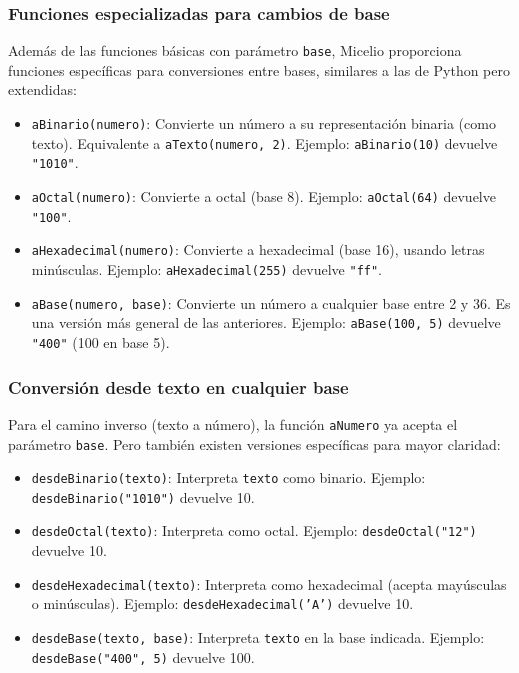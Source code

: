 \documentclass[12pt]{article}
\begin{document}
\subsubsection{Funciones especializadas para cambios de base}

Además de las funciones básicas con parámetro \texttt{base}, Micelio proporciona funciones específicas para conversiones entre bases, similares a las de Python pero extendidas:

\begin{itemize}
    \item \texttt{aBinario(numero)}: Convierte un número a su representación binaria (como texto). Equivalente a \texttt{aTexto(numero, 2)}. Ejemplo: \texttt{aBinario(10)} devuelve \texttt{"1010"}.
    
    \item \texttt{aOctal(numero)}: Convierte a octal (base 8). Ejemplo: \texttt{aOctal(64)} devuelve \texttt{"100"}.
    
    \item \texttt{aHexadecimal(numero)}: Convierte a hexadecimal (base 16), usando letras minúsculas. Ejemplo: \texttt{aHexadecimal(255)} devuelve \texttt{"ff"}.
    
    \item \texttt{aBase(numero, base)}: Convierte un número a cualquier base entre 2 y 36. Es una versión más general de las anteriores. Ejemplo: \texttt{aBase(100, 5)} devuelve \texttt{"400"} (100 en base 5).
\end{itemize}

\subsubsection{Conversión desde texto en cualquier base}

Para el camino inverso (texto a número), la función \texttt{aNumero} ya acepta el parámetro \texttt{base}. Pero también existen versiones específicas para mayor claridad:

\begin{itemize}
    \item \texttt{desdeBinario(texto)}: Interpreta \texttt{texto} como binario. Ejemplo: \texttt{desdeBinario("1010")} devuelve 10.
    \item \texttt{desdeOctal(texto)}: Interpreta como octal. Ejemplo: \texttt{desdeOctal("12")} devuelve 10.
    \item \texttt{desdeHexadecimal(texto)}: Interpreta como hexadecimal (acepta mayúsculas o minúsculas). Ejemplo: \texttt{desdeHexadecimal('A')} devuelve 10.
    \item \texttt{desdeBase(texto, base)}: Interpreta \texttt{texto} en la base indicada. Ejemplo: \texttt{desdeBase("400", 5)} devuelve 100.
\end{itemize}
\end{document}
